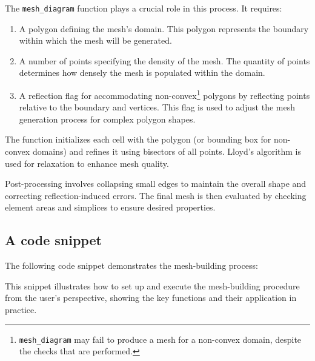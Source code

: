 The \lstinline{mesh_diagram} function plays a crucial role in this process. It requires:

\begin{enumerate}
    \item A polygon defining the mesh's domain. This polygon represents the boundary within which the mesh will be generated.
    \item A number of points specifying the density of the mesh. The quantity of points determines how densely the mesh is populated within the domain.
    \item A reflection flag for accommodating non-convex\footnote{\lstinline{mesh_diagram} may fail to produce a mesh for a non-convex domain, despite the checks that are performed.} polygons by reflecting points relative to the boundary and vertices. This flag is used to adjust the mesh generation process for complex polygon shapes.
\end{enumerate}

The function initializes each cell with the polygon (or bounding box for non-convex domains) and refines it using bisectors of all points. Lloyd's algorithm is used for relaxation to enhance mesh quality.

Post-processing involves collapsing small edges to maintain the overall shape and correcting reflection-induced errors. The final mesh is then evaluated by checking element areas and simplices to ensure desired properties.

\newpage
\subsection{A code snippet}

The following code snippet demonstrates the mesh-building process:



This snippet illustrates how to set up and execute the mesh-building procedure from the user's perspective, showing the key functions and their application in practice.
